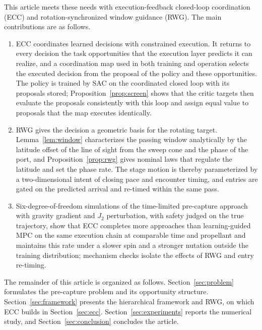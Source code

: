 This article meets these needs with execution-feedback closed-loop coordination (ECC) and rotation-synchronized window guidance (RWG). The main contributions are as follows.
\begin{enumerate}
\item ECC coordinates learned decisions with constrained execution. It returns to every decision the task opportunities that the execution layer predicts it can realize, and a coordination map used in both training and operation selects the executed decision from the proposal of the policy and these opportunities. The policy is trained by SAC on the coordinated closed loop with its proposals stored; Proposition~\ref{prop:screen} shows that the critic targets then evaluate the proposals consistently with this loop and assign equal value to proposals that the map executes identically.
\item RWG gives the decision a geometric basis for the rotating target. Lemma~\ref{lem:window} characterizes the passing window analytically by the latitude offset of the line of sight from the sweep cone and the phase of the port, and Proposition~\ref{prop:rwg} gives nominal laws that regulate the latitude and set the phase rate. The stage motion is thereby parameterized by a two-dimensional intent of closing pace and encounter timing, and entries are gated on the predicted arrival and re-timed within the same pass.
\item Six-degree-of-freedom simulations of the time-limited pre-capture approach with gravity gradient and $J_{2}$ perturbation, with safety judged on the true trajectory, show that ECC completes more approaches than learning-guided MPC on the same execution chain at comparable time and propellant and maintains this rate under a slower spin and a stronger nutation outside the training distribution; mechanism checks isolate the effects of RWG and entry re-timing.
\end{enumerate}

The remainder of this article is organized as follows. Section~\ref{sec:problem} formulates the pre-capture problem and its opportunity structure. Section~\ref{sec:framework} presents the hierarchical framework and RWG, on which ECC builds in Section~\ref{sec:ecc}. Section~\ref{sec:experiments} reports the numerical study, and Section~\ref{sec:conclusion} concludes the article.

